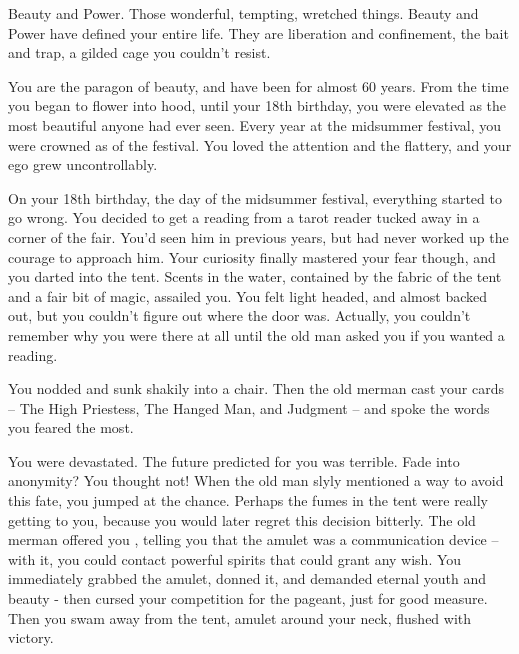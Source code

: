 \documentclass[char]{NeptuneBall}
\begin{document}
\name{\cWitch{}}




Beauty and Power. Those wonderful, tempting, wretched things. Beauty and Power have defined your entire life. They are liberation and confinement, the bait and trap, a gilded cage you couldn't resist.

You are the paragon of beauty, and have been for almost 60 years. From the time you began to flower into \cWitch{\human}hood, until your 18th birthday, you were elevated as the most beautiful \cWitch{\mer} anyone had ever seen. Every year at the midsummer festival, you were crowned as \cWitch{\King} of the festival. You loved the attention and the flattery, and your ego grew uncontrollably.

On your 18th birthday, the day of the midsummer festival, everything started to go wrong. You decided to get a reading from a tarot reader tucked away in a corner of the fair. You'd seen him in previous years, but had never worked up the courage to approach him. Your curiosity finally mastered your fear though, and you darted into the tent. Scents in the water, contained by the fabric of the tent and a fair bit of magic, assailed you. You felt light headed, and almost backed out, but you couldn't figure out where the door was. Actually, you couldn't remember why you were there at all until the old man asked you if you wanted a reading.

You nodded and sunk shakily into a chair. Then the old merman cast your cards -- The High Priestess, The Hanged Man, and Judgment -- and spoke the words you feared the most.

You were devastated. The future predicted for you was terrible. Fade into anonymity? You thought not! When the old man slyly mentioned a way to avoid this fate, you jumped at the chance. Perhaps the fumes in the tent were really getting to you, because you would later regret this decision bitterly. The old merman offered you \iAmulet{\MYname}, telling you that the amulet was a communication device -- with it, you could contact powerful spirits that could grant any wish. You immediately grabbed the amulet, donned it, and demanded eternal youth and beauty - then cursed your competition for the pageant, just for good measure. Then you swam away from the tent, amulet around your neck, flushed with victory. 
\end{document}
